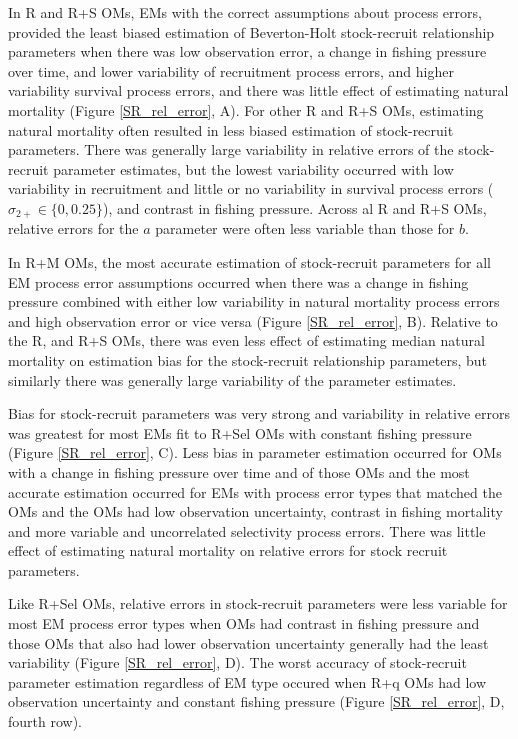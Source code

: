 \documentclass[
  12pt,
]{article}
\begin{document}
In R and R+S OMs, EMs with the correct assumptions about process errors,
provided the least biased estimation of Beverton-Holt stock-recruit
relationship parameters when there was low observation error, a change
in fishing pressure over time, and lower variability of recruitment
process errors, and higher variability survival process errors, and
there was little effect of estimating natural mortality (Figure
\ref{SR_rel_error}, A). For other R and R+S OMs, estimating natural
mortality often resulted in less biased estimation of stock-recruit
parameters. There was generally large variability in relative errors of
the stock-recruit parameter estimates, but the lowest variability
occurred with low variability in recruitment and little or no
variability in survival process errors (\(\sigma_{2+} \in \{0,0.25\}\)),
and contrast in fishing pressure. Across al R and R+S OMs, relative
errors for the \(a\) parameter were often less variable than those for
\(b\).

In R+M OMs, the most accurate estimation of stock-recruit parameters for
all EM process error assumptions occurred when there was a change in
fishing pressure combined with either low variability in natural
mortality process errors and high observation error or vice versa
(Figure \ref{SR_rel_error}, B). Relative to the R, and R+S OMs, there
was even less effect of estimating median natural mortality on
estimation bias for the stock-recruit relationship parameters, but
similarly there was generally large variability of the parameter
estimates.

Bias for stock-recruit parameters was very strong and variability in
relative errors was greatest for most EMs fit to R+Sel OMs with constant
fishing pressure (Figure \ref{SR_rel_error}, C). Less bias in parameter
estimation occurred for OMs with a change in fishing pressure over time
and of those OMs and the most accurate estimation occurred for EMs with
process error types that matched the OMs and the OMs had low observation
uncertainty, contrast in fishing mortality and more variable and
uncorrelated selectivity process errors. There was little effect of
estimating natural mortality on relative errors for stock recruit
parameters.

Like R+Sel OMs, relative errors in stock-recruit parameters were less
variable for most EM process error types when OMs had contrast in
fishing pressure and those OMs that also had lower observation
uncertainty generally had the least variability (Figure
\ref{SR_rel_error}, D). The worst accuracy of stock-recruit parameter
estimation regardless of EM type occured when R+q OMs had low
observation uncertainty and constant fishing pressure (Figure
\ref{SR_rel_error}, D, fourth row).
\end{document}
